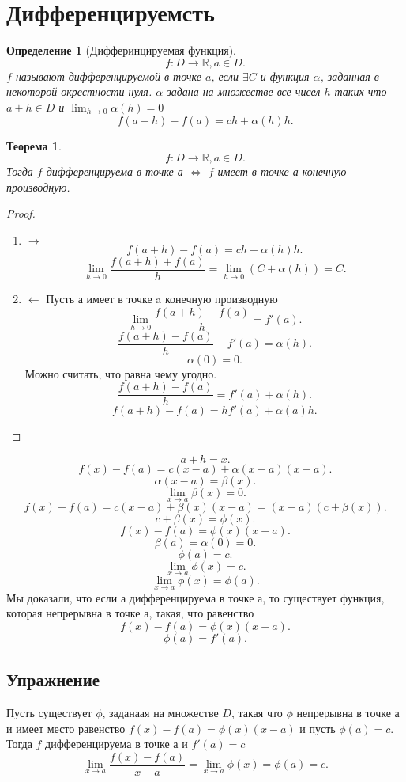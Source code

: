 \documentclass[a4paper]{article}
\newtheorem{theorem}{Теорема}
\newtheorem{definition}{Определение}
\begin{document}
\section{Дифференцируемсть}
\begin{definition}[Дифферинцируемая функция]
	\[
		f : D \to \mathbb{R},  a \in D
		.\]
	$f$ называют дифференцируемой в точке  $a$, если  $\exists  C$ и функция $\alpha$, заданная в некоторой окрестности нуля. $\alpha$ задана на множестве все чисел  $h$ таких что  $a + h \in D$ и $\lim_{h \to 0} \alpha(h) = 0$
	\[
		f(a + h ) - f(a) = ch + \alpha(h)h
		.\]
\end{definition}
\begin{theorem}
	\[
		f : D \to \mathbb{R}, a\in D
		.\]
	Тогда $f$ дифференцируема в точке а  $\iff$  $f$ имеет в точке а конечную производную.
\end{theorem}
\begin{proof}
	\begin{enumerate}
		\item $\rightarrow$
		      \[
			      f(a + h) - f(a) = ch + \alpha(h)h
			      .\]
		      \[
			      \lim_{h \to 0} \frac{f(a + h) + f(a)}{h} = \lim_{h \to 0} (C + \alpha(h)) =  C
			      .\]
		\item $\leftarrow$
		      Пусть $а$ имеет в точке a конечную производную
		      \[
			      \lim_{h \to 0} \frac{f(a + h) - f(a)}{h} =  f'(a)
			      .\]
		      \[
			      \frac{f(a + h) - f(a)}{h} - f'(a) = \alpha(h)
			      .\]
		      \[
			      \alpha(0) = 0
			      .\]
		      Можно считать, что равна чему угодно.
		      \[
			      \frac{f(a + h) - f(a)}{h} = f'(a) + \alpha(h)
			      .\]
		      \[
			      f(a + h) - f(a) = hf'(a) + \alpha(a)h
			      .\]
	\end{enumerate}
\end{proof}
\[
	a + h = x
	.\]
\[
	f(x) - f(a) = c(x - a) + \alpha(x - a)(x  - a)
	.\]
\[
	\alpha(x - a) =  \beta(x)
	.\]
\[
	\lim_{x \to a} \beta(x) = 0
	.\]
\[
	f(x) - f(a) = c(x - a) + \beta(x)(x  - a)= (x - a)(c + \beta(x))
	.\]
\[
	c + \beta(x) = \phi(x)
	.\]
\[
	f(x) - f(a) = \phi{(x)}(x-a)
	.\]
\[
	\beta(a) = \alpha(0) = 0
	.\]
\[
	\phi(a) =  c
	.\]
\[
	\lim_{x \to a} \phi(x) = c
	.\]
\[
	\lim_{x \to a} \phi(x) = \phi(a)
	.\]
Мы доказали, что если а дифференцируема в точке а, то существует функция, которая непрерывна в точке а, такая, что равенство
\[
	f(x) - f(a) = \phi(x)(x - a)
	.\]
\[
	\phi(a) = f'(a)
	.\]
\subsection{Упражнение}
Пусть существует $\phi$, заданаая на множестве  $D$, такая что  $\phi$ непрерывна в точке а и имеет место равенство  $f(x)  - f(a) = \phi(x)(x - a)$ и пусть  $\phi(a) =  c$. Тогда  $f$ дифференцируема в точке а и  $f'(a) = c$
\[
	\lim_{x \to a} \frac{f(x) - f(a)}{x - a} = \lim_{x \to a} \phi(x) = \phi(a) = c
	.\]
\end{document}
